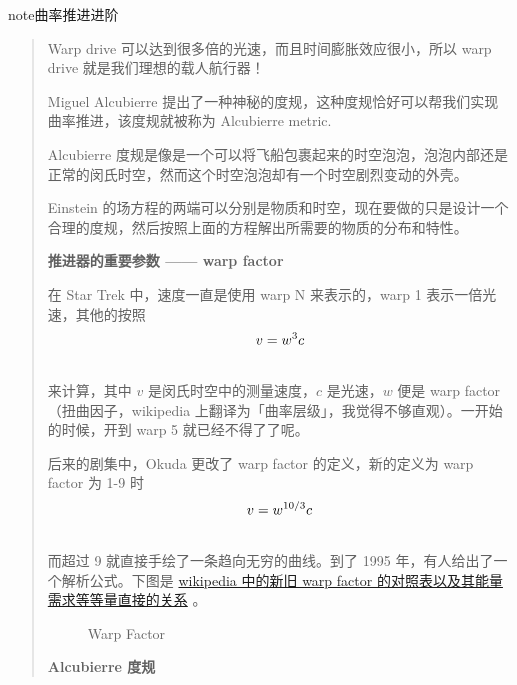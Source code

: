 \documentclass[letterpaper,10pt,english]{sphinxmanual}
\begin{document}
\begin{notice}{note}{曲率推进进阶}
\begin{quote}

Warp drive 可以达到很多倍的光速，而且时间膨胀效应很小，所以 warp drive 就是我们理想的载人航行器！

Miguel Alcubierre 提出了一种神秘的度规，这种度规恰好可以帮我们实现曲率推进，该度规就被称为 Alcubierre metric.

Alcubierre 度规是像是一个可以将飞船包裹起来的时空泡泡，泡泡内部还是正常的闵氏时空，然而这个时空泡泡却有一个时空剧烈变动的外壳。

Einstein 的场方程的两端可以分别是物质和时空，现在要做的只是设计一个合理的度规，然后按照上面的方程解出所需要的物质的分布和特性。

\textbf{推进器的重要参数 —— warp factor}

在 Star Trek 中，速度一直是使用 warp N 来表示的，warp 1 表示一倍光速，其他的按照
\begin{gather}
\begin{split}v=w^3c\end{split}\notag\\\begin{split}\end{split}\notag
\end{gather}
来计算，其中 $v$ 是闵氏时空中的测量速度，$c$ 是光速，$w$ 便是 warp factor（扭曲因子，wikipedia 上翻译为「曲率层级」，我觉得不够直观）。一开始的时候，开到 warp 5 就已经不得了了呢。

后来的剧集中，Okuda 更改了 warp factor 的定义，新的定义为 warp factor 为 1-9 时
\begin{gather}
\begin{split}v=w^{10/3}c\end{split}\notag\\\begin{split}\end{split}\notag
\end{gather}
而超过 9 就直接手绘了一条趋向无穷的曲线。到了 1995 年，有人给出了一个解析公式。下图是 \href{http://en.wikipedia.org/wiki/File:Warptable.gif}{wikipedia 中的新旧 warp factor 的对照表以及其能量需求等等量直接的关系} 。
\begin{figure}[htbp]
\centering
\capstart
\caption{Warp Factor}\end{figure}

\textbf{Alcubierre 度规}


\end{quote}
\end{notice}
\end{document}
